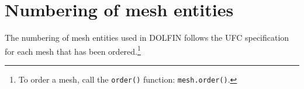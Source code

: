 \chapter{Numbering of mesh entities}

The numbering of mesh entities used in DOLFIN follows the
UFC specification~\cite{www:UFC} for each mesh that has been ordered.\footnote{To order a mesh, call the \texttt{order()} function: \texttt{mesh.order()}.}

